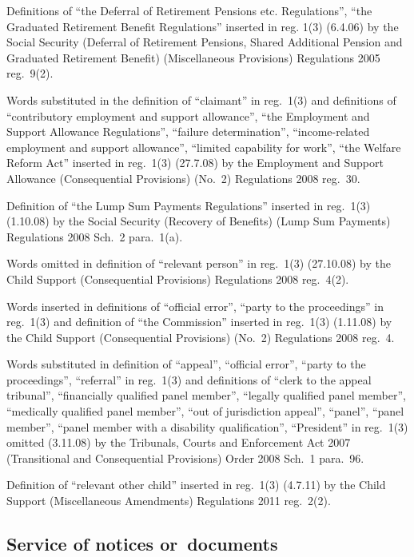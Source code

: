 \documentclass[12pt,a4paper]{article}
\begin{document}
{Definitions of ``the Deferral of Retirement Pensions etc. Regulations'', ``the Graduated Retirement Benefit Regulations'' inserted in reg. 1(3) (6.4.06) by the Social Security (Deferral of Retirement Pensions, Shared Additional Pension and Graduated Retirement Benefit) (Miscellaneous Provisions) Regulations 2005 reg.~9(2).

Words substituted in the definition of ``claimant'' in reg.~1(3) and definitions of ``contributory employment and support allowance'', ``the Employment and Support Allowance Regulations'', ``failure determination'', ``income-related employment and support allowance'', ``limited capability for work'', ``the Welfare Reform Act'' inserted in reg.~1(3) (27.7.08) by the Employment and Support Allowance (Consequential Provisions) (No.~2) Regulations 2008 reg.~30.

Definition of ``the Lump Sum Payments Regulations'' inserted in reg.~1(3) (1.10.08) by the Social Security (Recovery of Benefits) (Lump Sum Payments) Regulations 2008 Sch.~2 para.~1(a).

Words omitted in definition of ``relevant person'' in reg.~1(3) (27.10.08) by the Child Support (Consequential Provisions) Regulations 2008 reg.~4(2).

Words inserted in definitions of ``official error'', ``party to the proceedings'' in reg.~1(3) and definition of ``the Commission'' inserted in reg.~1(3) (1.11.08) by the Child Support (Consequential Provisions) (No.~2) Regulations 2008 reg.~4.

Words substituted in definition of ``appeal'', ``official error'', ``party to the proceedings'', ``referral'' in reg.~1(3) and definitions of ``clerk to the appeal tribunal'', ``financially qualified panel member'', ``legally qualified panel member'', ``medically qualified panel member'', ``out of jurisdiction appeal'', ``panel'', ``panel member'', ``panel member with a disability qualification'', ``President'' in reg.~1(3) omitted (3.11.08) by the Tribunals, Courts and Enforcement Act 2007 (Transitional and Consequential Provisions) Order 2008 Sch.~1 para.~96.

Definition of ``relevant other child'' inserted in reg.~1(3) (4.7.11) by the Child Support (Miscellaneous Amendments) Regulations 2011 reg.~2(2).
}

\subsection[2. Service of notices or~documents]{Service of notices or~documents}
\end{document}
